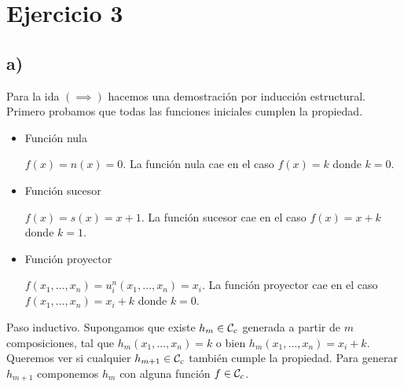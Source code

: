 \section*{Ejercicio 3}

\subsection*{a)}

Para la ida $(\implies)$ hacemos una demostración por inducción estructural. Primero probamos que todas las funciones iniciales cumplen la propiedad.

\begin{itemize}
    \item Función nula

    $f(x) = n(x) = 0$. La función nula cae en el caso $f(x) = k$ donde $k = 0$.

    \item Función sucesor

    $f(x) = s(x) = x + 1$. La función sucesor cae en el caso $f(x) = x + k$ donde $k = 1$.

    \item Función proyector

    $f(x_1, \dots, x_n) = u^n_i(x_1, \dots, x_n) = x_i$. La función proyector cae en el caso $f(x_1, \dots, x_n) = x_i + k$ donde $k = 0$.
\end{itemize}

Paso inductivo. Supongamos que existe $h_m \in \mathcal{C}_c$ generada a partir de $m$ composiciones, tal que $h_m(x_1, \dots, x_n) = k$ o bien $h_m(x_1, \dots, x_n) = x_i + k$. Queremos ver si cualquier $h_{m+1} \in \mathcal{C}_c$ también cumple la propiedad. Para generar $h_{m+1}$ componemos $h_m$ con alguna función $f \in \mathcal{C}_c$.


